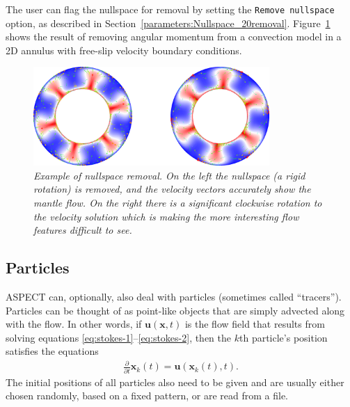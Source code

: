 \documentclass{article}
\newcommand{\aspect}{\textsc{ASPECT}}
\begin{document}
The user can flag the nullspace for removal by setting the \texttt{Remove nullspace} option,
as described in Section~\ref{parameters:Nullspace_20removal}.
Figure~\ref{fig:rigid_rotation} shows the result of removing angular momentum from a convection
model in a 2D annulus with free-slip velocity boundary conditions.

\begin{figure}[tbp]
  \centering
  \includegraphics[width=0.8\textwidth]{rigid_rotation.png}
  \caption{\it Example of nullspace removal.
On the left the nullspace (a rigid rotation) is removed, and the velocity vectors accurately
show the mantle flow. On the right there is a significant clockwise rotation to the velocity
solution which is making the more interesting flow features difficult to see. }
  \label{fig:rigid_rotation}
\end{figure}


\subsection{Particles}
\label{sec:particles}

\aspect{} can, optionally, also deal with particles (sometimes called
``tracers''). Particles can be thought of as point-like objects that are simply
advected along with the flow. In other words, if $\mathbf u(\mathbf x,t)$ is the
flow field that results from solving equations
\eqref{eq:stokes-1}--\eqref{eq:stokes-2}, then the $k$th particle's position
satisfies the equations
\begin{align}
  \frac{\partial}{\partial t} \mathbf x_k(t)
  = \mathbf u(\mathbf x_k(t),t).
\end{align}
The initial positions of all particles also need to be given and are usually
either chosen randomly, based on a fixed pattern, or are read from a file.
\end{document}
